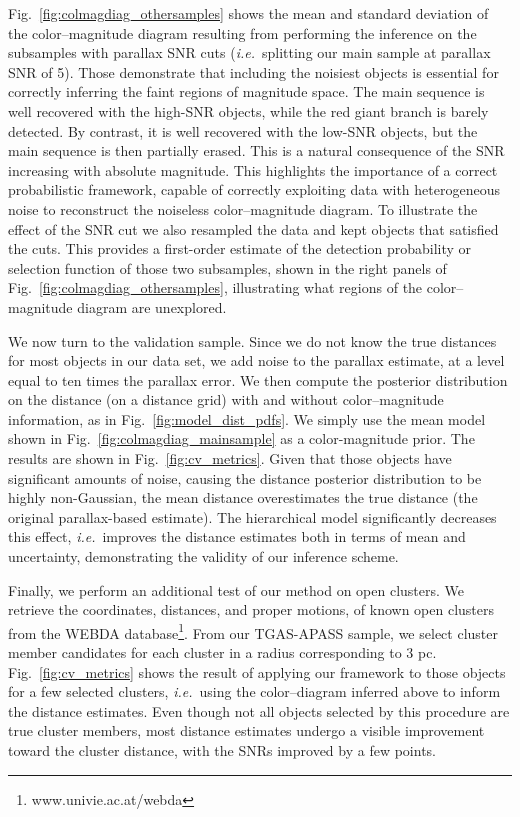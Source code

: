 \documentclass[manuscript, letterpaper]{aastex6}
\newcommand{\ie}{{\textit{i.e.}~}}
\newcommand{\figref}[1]{{\xspace}Fig.~\ref{#1}}
\begin{document}
\figref{fig:colmagdiag_othersamples} shows the mean and standard deviation of the color--magnitude diagram resulting from performing the inference on the subsamples with parallax SNR cuts (\ie splitting our main sample at parallax SNR of 5). 
Those demonstrate that including the noisiest objects is essential for correctly inferring the faint regions of magnitude space.
The main sequence is well recovered with the high-SNR objects, while the red giant branch is barely detected. 
By contrast, it is well recovered with the low-SNR objects, but the main sequence is then partially erased.
This is a natural consequence of the SNR increasing with absolute magnitude.
This highlights the importance of a correct probabilistic framework, capable of correctly exploiting data with heterogeneous noise to reconstruct the noiseless color--magnitude diagram.
To illustrate the effect of the SNR cut we also resampled the data and kept objects that satisfied the cuts.
This provides a first-order estimate of the detection probability or selection function of those two subsamples, shown in the right panels of \figref{fig:colmagdiag_othersamples}, illustrating what regions of the color--magnitude diagram are unexplored.

We now turn to the validation sample. 
Since we do not know the true distances for most objects in our data set, we add noise to the parallax estimate, at a level equal to ten times the parallax error. 
We then compute the posterior distribution on the distance (on a distance grid) with and without color--magnitude information, as in \figref{fig:model_dist_pdfs}. 
We simply use the mean model shown in \figref{fig:colmagdiag_mainsample} as a color-magnitude prior. 
The results are shown in \figref{fig:cv_metrics}.
Given that those objects have significant amounts of noise, causing the distance posterior distribution to be highly non-Gaussian, the mean distance overestimates the true distance (the original parallax-based estimate). 
The hierarchical model significantly decreases this effect, \ie improves the distance estimates both in terms of mean and uncertainty, demonstrating the validity of our inference scheme.

Finally, we perform an additional test of our method on open clusters.
We retrieve the coordinates, distances, and proper motions, of known open clusters from the WEBDA database\footnote{www.univie.ac.at/webda}.
From our TGAS-APASS sample, we select cluster member candidates for each cluster in a radius corresponding to 3 pc.
\figref{fig:cv_metrics} shows the result of applying our framework to those objects for a few selected clusters, \ie using the color--diagram inferred above to inform the distance estimates.
Even though not all objects selected by this procedure are true cluster members, most distance estimates undergo a visible improvement toward the cluster distance, with the SNRs improved by a few points.
\end{document}
